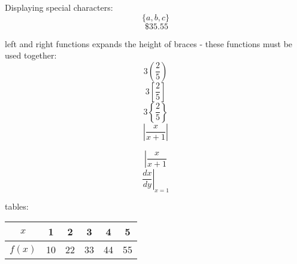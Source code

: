 \documentclass[11]{article}
\begin{document}
Displaying special characters:
$$ \{a, b, c\} $$ %
$$ \ \$ 35.55 $$ %

left and right functions expands the height of braces - these functions must be used together:
$$ 3\left(\frac{2}{5}\right) $$
$$ 3\left[\frac{2}{5}\right] $$
$$ 3\left\{\frac{2}{5}\right\} $$
$$ \left|\frac{x}{x+1}\right| $$

$$ \left| \frac{x}{x+1} \right. $$ %
$$ \left. \frac{dx}{dy} \right|_{x = 1} $$ 

tables: %

\begin{tabular}{c|ccccc} 
	$x$ & 1 & 2 & 3 & 4 & 5 \\ 
	\hline %
	$f(x)$ & 10 & 22 & 33 & 44 & 55
\end{tabular}
\end{document}
